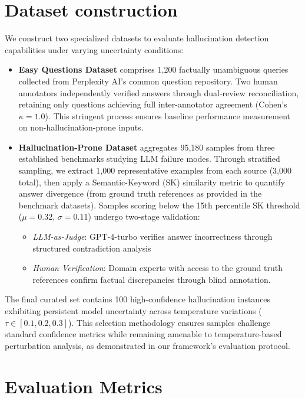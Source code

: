 \documentclass[sigconf]{acmart}
\begin{document}
\section{Dataset construction}

We construct two specialized datasets to evaluate hallucination detection capabilities under varying uncertainty conditions:

\begin{itemize}
    \item \textbf{Easy Questions Dataset} comprises 1,200 factually unambiguous queries collected from Perplexity AI's common question repository. Two human annotators independently verified answers through dual-review reconciliation, retaining only questions achieving full inter-annotator agreement (Cohen's $\kappa = 1.0$). This stringent process ensures baseline performance measurement on non-hallucination-prone inputs.

    \item \textbf{Hallucination-Prone Dataset} aggregates 95,180 samples from three established benchmarks \cite{defan_dataset,ignorance_vs_error,halueval} studying LLM failure modes. Through stratified sampling, we extract 1,000 representative examples from each source (3,000 total), then apply a Semantic-Keyword (SK) similarity metric to quantify answer divergence (from ground truth references as provided in the benchmark datasets). Samples scoring below the 15th percentile SK threshold ($\mu = 0.32$, $\sigma = 0.11$) undergo two-stage validation:
    \begin{itemize}
        \item \textit{LLM-as-Judge}: GPT-4-turbo verifies answer incorrectness through structured contradiction analysis
        \item \textit{Human Verification}: Domain experts with access to the ground truth references confirm factual discrepancies through blind annotation.
    \end{itemize}
\end{itemize}

The final curated set contains 100 high-confidence hallucination instances exhibiting persistent model uncertainty across temperature variations ($\tau \in [0.1, 0.2, 0.3]$). This selection methodology ensures samples challenge standard confidence metrics while remaining amenable to temperature-based perturbation analysis, as demonstrated in our framework's evaluation protocol.

\section{Evaluation Metrics}
\end{document}
